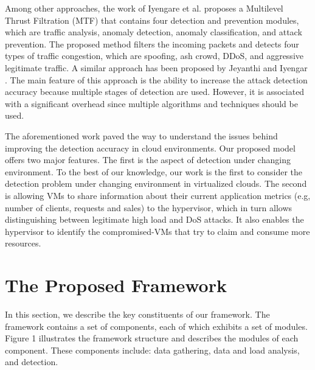 \documentclass[twocolumn]{bmcart}%
\begin{document}
Among other approaches, the work of Iyengare et al. \cite{iyengar2014multilevel} proposes a Multilevel Thrust Filtration (MTF) that contains four detection and prevention modules, which are traffic analysis, anomaly detection, anomaly classification, and attack prevention. The proposed method filters the incoming packets and detects four types of traffic congestion, which are spoofing, ash crowd, DDoS, and aggressive legitimate traffic. A similar approach has been proposed by Jeyanthi and Iyengar \cite{jeyanthi2013escape}. The main feature of this approach is the ability to increase the attack detection accuracy because multiple stages of detection are used. However, it is associated with a significant overhead since multiple algorithms and techniques should be used.

The aforementioned work paved the way to understand the issues behind improving the detection accuracy in cloud environments. Our proposed model offers two major features. The first is the aspect of detection under changing environment. To the best of our knowledge, our work is the first to consider the detection problem under changing environment in virtualized clouds. The second is allowing VMs to share information about their current application metrics (e.g, number of clients, requests and sales) to the hypervisor, which in turn allows distinguishing between legitimate high load and DoS attacks. It also enables the hypervisor to identify the compromised-VMs that try to claim and consume more resources.


\section*{The Proposed Framework}
In this section, we describe the key constituents of our framework. The framework contains a set of components, each of which exhibits a set of modules. Figure 1 illustrates the framework structure and describes the modules of each component. These components include: data gathering, data and load analysis, and detection.
\end{document}
